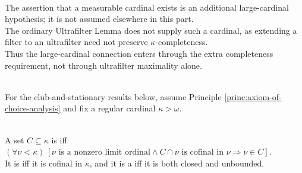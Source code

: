 \begin{remark} \label{rem:measurable-cardinal-assumption-boundary} \\
The assertion that a measurable cardinal exists is an additional large-cardinal hypothesis; it is not assumed elsewhere in this part.\\
The ordinary Ultrafilter Lemma does not supply such a cardinal, as extending a filter to an ultrafilter need not preserve $\kappa$-completeness.\\
Thus the large-cardinal connection enters through the extra completeness requirement, not through ultrafilter maximality alone.
\end{remark}

\begin{assumption} \label{assump:club-and-stationary-setting} \\
For the club-and-stationary results below, assume Principle \ref{princ:axiom-of-choice-analysis} and fix a regular cardinal $\kappa>\omega$.
\end{assumption}

\begin{definition} \label{def:club-subset-of-regular-cardinal} \\
A set $C\subseteq\kappa$ is  iff $(\forall\nu<\kappa)\,[\nu\text{ is a nonzero limit ordinal}\land C\cap\nu\text{ is cofinal in }\nu\Rightarrow\nu\in C]$.\\
It is  iff it is cofinal in $\kappa$, and it is a  iff it is both closed and unbounded.
\end{definition}

